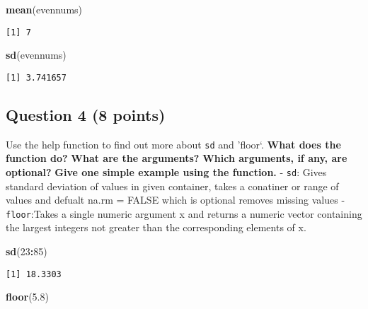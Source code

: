\documentclass[
]{article}
\newenvironment{Shaded}{\begin{snugshade}}{\end{snugshade}}
\newcommand{\DecValTok}[1]{\textcolor[rgb]{0.00,0.00,0.81}{#1}}
\newcommand{\FloatTok}[1]{\textcolor[rgb]{0.00,0.00,0.81}{#1}}
\newcommand{\FunctionTok}[1]{\textcolor[rgb]{0.13,0.29,0.53}{\textbf{#1}}}
\newcommand{\NormalTok}[1]{#1}
\newcommand{\SpecialCharTok}[1]{\textcolor[rgb]{0.81,0.36,0.00}{\textbf{#1}}}
\begin{document}
\begin{Shaded}
\begin{Highlighting}[]
\FunctionTok{mean}\NormalTok{(evennums)}
\end{Highlighting}
\end{Shaded}

\begin{verbatim}
[1] 7
\end{verbatim}

\begin{Shaded}
\begin{Highlighting}[]
\FunctionTok{sd}\NormalTok{(evennums)}
\end{Highlighting}
\end{Shaded}

\begin{verbatim}
[1] 3.741657
\end{verbatim}

\subsection{Question 4 (8 points)}\label{question-4-8-points}

Use the help function to find out more about \texttt{sd} and 'floor`.
\textbf{What does the function do?} \textbf{What are the arguments?}
\textbf{Which arguments, if any, are optional?} \textbf{Give one simple
example using the function.} - \texttt{sd}: Gives standard deviation of
values in given container, takes a conatiner or range of values and
defualt na.rm = FALSE which is optional removes missing values -
\texttt{floor}:Takes a single numeric argument x and returns a numeric
vector containing the largest integers not greater than the
corresponding elements of x.

\begin{Shaded}
\begin{Highlighting}[]
\FunctionTok{sd}\NormalTok{(}\DecValTok{23}\SpecialCharTok{:}\DecValTok{85}\NormalTok{)}
\end{Highlighting}
\end{Shaded}

\begin{verbatim}
[1] 18.3303
\end{verbatim}

\begin{Shaded}
\begin{Highlighting}[]
\FunctionTok{floor}\NormalTok{(}\FloatTok{5.8}\NormalTok{)}
\end{Highlighting}
\end{Shaded}
\end{document}
